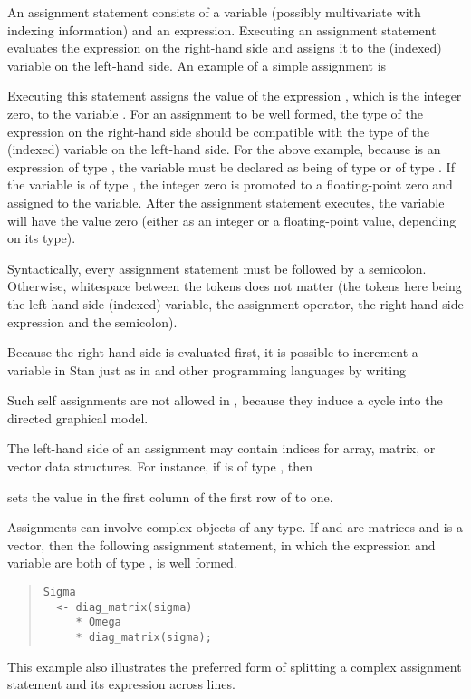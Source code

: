 An assignment statement consists of a variable (possibly multivariate
with indexing information) and an expression.  Executing an
assignment statement evaluates the expression on the right-hand side
and assigns it to the (indexed) variable on the left-hand side.  An
example of a simple assignment is
%
\begin{quote}
\end{quote}
%
Executing this statement assigns the value of the expression ,
which is the integer zero, to the variable .  For an assignment
to be well formed, the type of the expression on the right-hand side
should be compatible with the type of the (indexed) variable on the
left-hand side.  For the above example, because  is an
expression of type , the variable  must be declared
as being of type  or of type .  If the variable
is of type , the integer zero is promoted to a
floating-point zero and assigned to the variable.  After the
assignment statement executes, the variable  will have the
value zero (either as an integer or a floating-point value, depending on
its type).

Syntactically, every assignment statement must be followed by a
semicolon.  Otherwise, whitespace between the tokens does not matter
(the tokens here being the left-hand-side (indexed) variable, the
assignment operator, the right-hand-side expression and the
semicolon).

Because the right-hand side is evaluated first, it is possible to
increment a variable in Stan just as in \Cpp and other programming
languages by writing
%
\begin{quote}
\end{quote}
%
Such self assignments are not allowed in \BUGS, because they induce a
cycle into the directed graphical model.

The left-hand side of an assignment may contain indices for array,
matrix, or vector data structures.  For instance, if  is
of type , then
%
\begin{quote}
\end{quote}
%
sets the value in the first column of the first row of  to one.

Assignments can involve complex objects of any type.  If 
and  are matrices and  is a vector, then the
following assignment statement, in which the expression and variable
are both of type , is well formed.
%
\begin{quote}
\begin{Verbatim}
Sigma
  <- diag_matrix(sigma)
     * Omega 
     * diag_matrix(sigma);
\end{Verbatim}
\end{quote}
%
This example also illustrates the preferred form of splitting a
complex assignment statement and its expression across lines.

